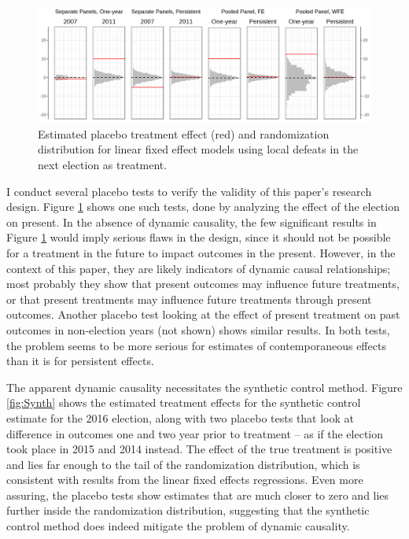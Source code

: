 \documentclass[12pt]{article}\usepackage[]{graphicx}\usepackage[]{color}
\newcommand{\1}{\mathbbm{1}}
\begin{document}
\begin{figure}[!htbp]
	\centering
	\includegraphics[width=\textwidth]{figure/SYP_FE_PLACE.png}
	\captionsetup{singlelinecheck=off}
	\caption[Estimated effects of future treatment]{Estimated placebo treatment effect (red) and randomization distribution for linear fixed effect models using local defeats in the next election as treatment.}
	\label{fig:Place}
\end{figure}

I conduct several placebo tests to verify the validity of this paper's research design. Figure \ref{fig:Place} shows one such tests, done by analyzing the effect of the  election on present. In the absence of dynamic causality, the few significant results in Figure \ref{fig:Place} would imply serious flaws in the design, since it should not be possible for a treatment in the future to impact outcomes in the present. However, in the context of this paper, they are likely indicators of dynamic causal relationships; most probably they show that present outcomes may influence future treatments, or that present treatments may influence future treatments through present outcomes. Another placebo test looking at the effect of present treatment on past outcomes in non-election years (not shown) shows similar results. In both tests, the problem seems to be more serious for estimates of contemporaneous effects than it is for persistent effects.

The apparent dynamic causality necessitates the synthetic control method. Figure \ref{fig:Synth} shows the estimated treatment effects for the synthetic control estimate for the 2016 election, along with two placebo tests that look at difference in outcomes one and two year prior to treatment -- as if the election took place in 2015 and 2014 instead. The effect of the true treatment is positive and lies far enough to the tail of the randomization distribution, which is consistent with results from the linear fixed effects regressions. Even more assuring, the placebo tests show estimates that are much closer to zero and lies further inside the randomization distribution, suggesting that the synthetic control method does indeed mitigate the problem of dynamic causality.
\end{document}
